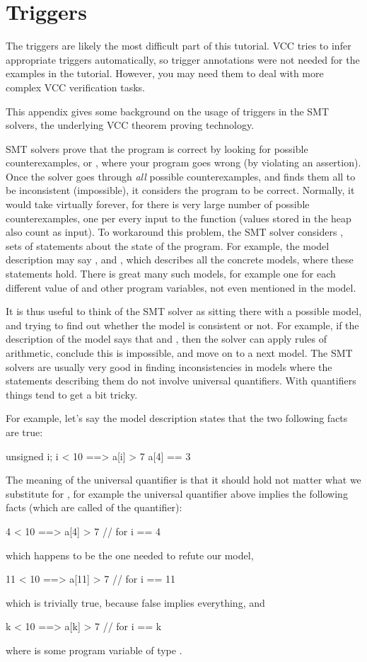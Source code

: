 \section{Triggers}

The triggers are likely the most difficult part of this tutorial.
VCC tries to infer appropriate triggers automatically, so 
trigger annotations were not needed for the examples in the tutorial.
However, you may need them to deal with more complex VCC verification
tasks.

This appendix gives some background on the usage of triggers in the 
SMT solvers, the underlying VCC theorem proving technology.

SMT solvers
prove that the program is correct by looking for possible counterexamples,
or , where your program goes wrong (\eg by violating an assertion).
Once the solver goes through \emph{all} possible counterexamples, and finds them
all to be inconsistent (\ie impossible),
it considers the program to be correct.
Normally, it would take virtually forever, for there is very large number of
possible counterexamples, one per every input to the function (values stored in
the heap also count as input).
To workaround this problem, the SMT solver considers
, \ie 
sets of statements about the state of the program.
For example, the model description may say , 
and , which describes all the concrete models, where
these statements hold. There is great many such models,
for example one for each different value of  and other program variables,
not even mentioned in the model.

It is thus useful to think of the SMT solver as sitting there with
a possible model, and trying to find out whether the model is consistent or not.
For example, if the description of the model says that  and
, then the solver can apply rules of arithmetic, conclude this is
impossible, and move on to a next model.
The SMT solvers are usually very good in finding inconsistencies in models
where the statements describing them do not involve universal quantifiers.
With quantifiers things tend to get a bit tricky.

For example, let's say the model description states that the two
following facts are true:
\begin{VCC}
\forall unsigned i; i < 10 ==> a[i] > 7
a[4] == 3
\end{VCC}
The meaning of the universal quantifier is that it should hold
not matter what we substitute for , for example
the universal quantifier above implies the following facts (which
are called  of the quantifier):
\begin{VCC}
 4 < 10 ==>  a[4] > 7  // for i == 4
\end{VCC}
which happens to be the one needed to refute our model,
\begin{VCC}
11 < 10 ==> a[11] > 7  // for i == 11
\end{VCC}
which is trivially true, because false implies everything, and
\begin{VCC}
 k < 10 ==>  a[k] > 7  // for i == k
\end{VCC}
where  is some program variable of type .

